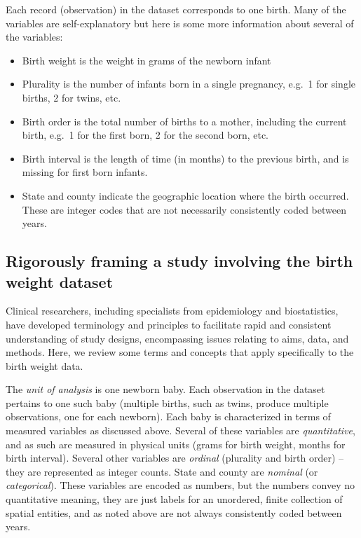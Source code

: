 Each record (observation) in the dataset corresponds to one birth.  Many of the variables are self-explanatory but here is some more information about several of the variables:

\begin{itemize}

\item Birth weight is the weight in grams of the newborn infant

\item Plurality is the number of infants born in a single pregnancy, e.g.\ 1 for single births, 2 for twins, etc.

\item Birth order is the total number of births to a mother, including the current birth, e.g.\ 1 for the first born, 2 for the second born, etc.

\item Birth interval is the length of time (in months) to the previous birth, and is missing for first born infants.

\item State and county indicate the geographic location where the birth occurred.  These are integer codes that are not necessarily consistently coded between years.

\end{itemize}

\subsection{Rigorously framing a study involving the birth weight dataset}

Clinical researchers, including specialists from epidemiology and biostatistics, have developed terminology and principles to facilitate rapid and consistent understanding of study designs, encompassing issues relating to aims, data, and methods.  Here, we review some terms and concepts that apply specifically to the birth weight data.

The {\em unit of analysis} is one newborn baby.  Each observation in the dataset pertains to one such baby (multiple births, such as twins, produce multiple observations, one for each newborn).  Each baby is characterized in terms of measured variables as discussed above.  Several of these variables are {\em quantitative}, and as such are measured in physical units (grams for birth weight, months for birth interval).  Several other variables are {\em ordinal} (plurality and birth order) -- they are represented as integer counts.  State and county are {\em nominal} (or {\em categorical}).  These variables are encoded as numbers, but the numbers convey no quantitative meaning, they are just labels for an unordered, finite collection of spatial entities, and as noted above are not always consistently coded between years.

